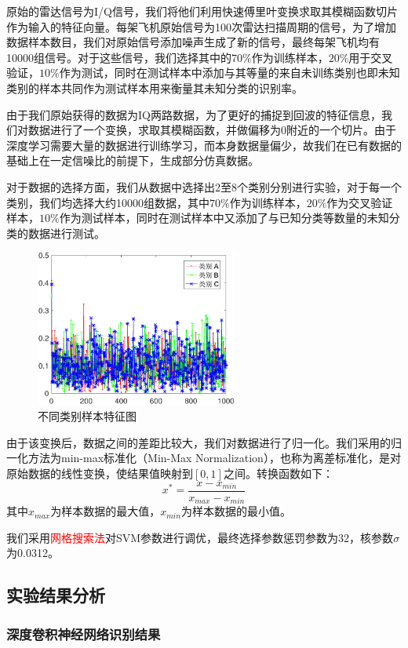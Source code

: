 原始的雷达信号为I/Q信号，我们将他们利用快速傅里叶变换求取其模糊函数切片作为输入的特征向量。每架飞机原始信号为100次雷达扫描周期的信号，为了增加数据样本数目，我们对原始信号添加噪声生成了新的信号，最终每架飞机均有10000组信号。对于这些信号，我们选择其中的$70\%$作为训练样本，$20\%$用于交叉验证，$10\%$作为测试，同时在测试样本中添加与其等量的来自未训练类别也即未知类别的样本共同作为测试样本用来衡量其未知分类的识别率。

由于我们原始获得的数据为IQ两路数据，为了更好的捕捉到回波的特征信息，我们对数据进行了一个变换，求取其模糊函数，并做偏移为0附近的一个切片。由于深度学习需要大量的数据进行训练学习，而本身数据量偏少，故我们在已有数据的基础上在一定信噪比的前提下，生成部分仿真数据。

对于数据的选择方面，我们从数据中选择出2至8个类别分别进行实验，对于每一个类别，我们均选择大约10000组数据，其中$70\%$作为训练样本，$20\%$作为交叉验证样本，$10\%$作为测试样本，同时在测试样本中又添加了与已知分类等数量的未知分类的数据进行测试。
\begin{figure}[htb]
	\centering
	\includegraphics[width=6.67cm]{figures/emitter/diff_data}
	\caption{不同类别样本特征图}
\end{figure}
由于该变换后，数据之间的差距比较大，我们对数据进行了归一化。我们采用的归一化方法为min-max标准化（Min-Max Normalization），也称为离差标准化，是对原始数据的线性变换，使结果值映射到$[0 , 1]$之间。转换函数如下：
\begin{equation}
x^{*}=\frac{x-x_{min}}{x_{max}-x_{min}}
\end{equation}
其中$x_{max}$为样本数据的最大值，$x_{min}$为样本数据的最小值。

我们采用\textcolor{red}{网格搜索法}对SVM参数进行调优，最终选择参数惩罚参数为32，核参数$\sigma$为0.0312。

\subsection{实验结果分析}

\subsubsection{深度卷积神经网络识别结果}

